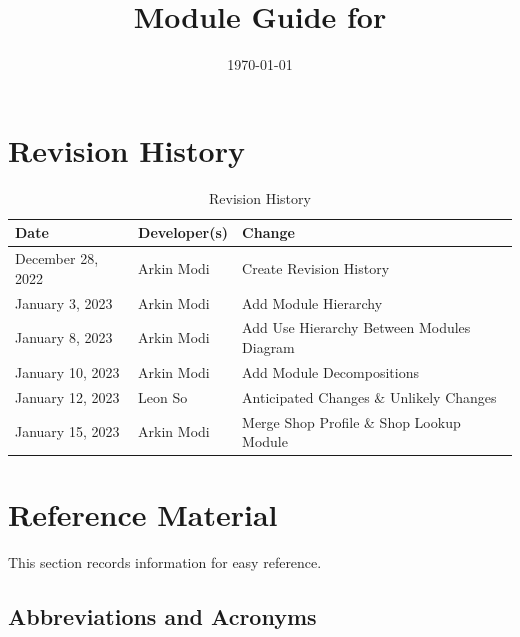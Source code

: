\documentclass[12pt, titlepage]{article}
\begin{document}
\title{Module Guide for \progname{}}
\author{\authname}
\date{\today}

\maketitle


\section{Revision History}

\begin{table}[hp]
	\caption{Revision History} \label{TblRevisionHistory}
	\begin{tabularx}{\textwidth}{llX}
		\toprule
		\textbf{Date}     & \textbf{Developer(s)} & \textbf{Change}                           \\
		\midrule
		December 28, 2022 & Arkin Modi            & Create Revision History                   \\
		January 3, 2023   & Arkin Modi            & Add Module Hierarchy                      \\
		January 8, 2023   & Arkin Modi            & Add Use Hierarchy Between Modules Diagram \\
		January 10, 2023  & Arkin Modi            & Add Module Decompositions                 \\
		January 12, 2023  & Leon So               & Anticipated Changes \& Unlikely Changes   \\
		January 15, 2023  & Arkin Modi            & Merge Shop Profile \& Shop Lookup Module  \\
		\bottomrule
	\end{tabularx}
\end{table}

\newpage

\section{Reference Material}

This section records information for easy reference.

\subsection{Abbreviations and Acronyms}
\end{document}
